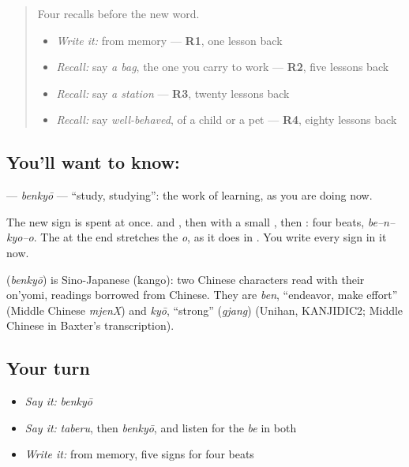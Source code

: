 \begin{quote}
Four recalls before the new word.

\begin{itemize}
\raggedright
  \item \emph{Write it:} \textbf{} from memory — \textbf{R1}, one lesson back
  \item \emph{Recall:} say \emph{a bag}, the one you carry to work — \textbf{R2}, five lessons back
  \item \emph{Recall:} say \emph{a station} — \textbf{R3}, twenty lessons back
  \item \emph{Recall:} say \emph{well-behaved}, of a child or a pet — \textbf{R4}, eighty lessons back
\end{itemize}
\end{quote}

\subsection*{You'll want to know: }
\textbf{} — \emph{benkyō} — \textquotedblleft{}study, studying\textquotedblright{}: the work of learning, as you are doing now.

The new sign is spent at once. \textbf{} and \textbf{}, then \textbf{} with a small \textbf{}, then \textbf{}: four beats, \emph{be–n–kyo–o}. The \textbf{} at the end stretches the \emph{o}, as it does in \textbf{}. You write every sign in it now.

\begin{cousinweb}
\textbf{} (\emph{benkyō}) is Sino-Japanese (kango): two Chinese characters read with their on'yomi, readings borrowed from Chinese. They are \emph{ben}, \textquotedblleft{}endeavor, make effort\textquotedblright{} (Middle Chinese \emph{mjenX}) and \emph{kyō}, \textquotedblleft{}strong\textquotedblright{} (\emph{gjang}) (Unihan, KANJIDIC2; Middle Chinese in Baxter's transcription).
\end{cousinweb}

\subsection*{Your turn}
\begin{itemize}
\raggedright
  \item \emph{Say it:} \emph{benkyō}
  \item \emph{Say it:} \emph{taberu}, then \emph{benkyō}, and listen for the \emph{be} in both
  \item \emph{Write it:} \textbf{} from memory, five signs for four beats
\end{itemize}

